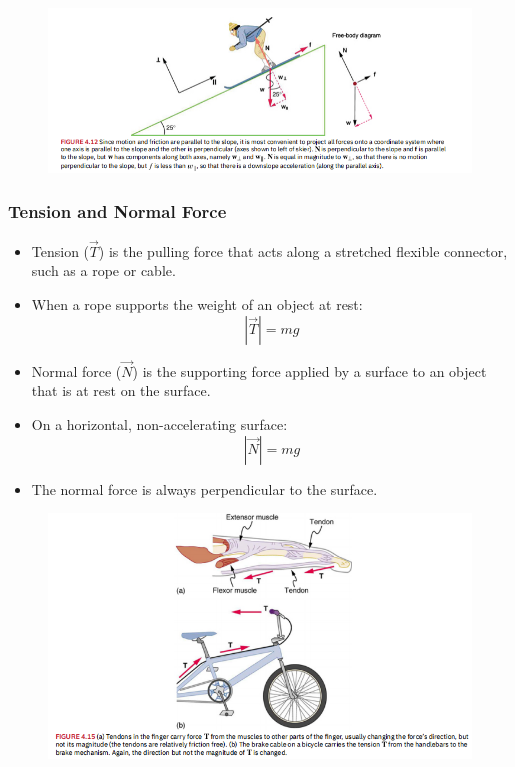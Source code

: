 \documentclass{beamer}
\begin{document}
\begin{frame}
\begin{figure}
    \centering
    \includegraphics[width=1.0\linewidth]{Screenshot 2024-10-21 152424.png}
\end{figure}
\end{frame}
\begin{frame}
\frametitle{Tension and Normal Force}
\begin{itemize}
    \item Tension ($\vec{T}$) is the pulling force that acts along a stretched flexible connector, such as a rope or cable.
    \item When a rope supports the weight of an object at rest:
    \[|\vec{T}| = mg\]
    \item Normal force ($\vec{N}$) is the supporting force applied by a surface to an object that is at rest on the surface.
    \item On a horizontal, non-accelerating surface:
    \[|\vec{N}| = mg\]
    \item The normal force is always perpendicular to the surface.
\end{itemize}
\end{frame}

\begin{frame}
\begin{figure}
    \centering
    \includegraphics[width=1\linewidth]{Screenshot 2024-10-21 152741.png}
\end{figure}
\end{frame}
\end{document}
